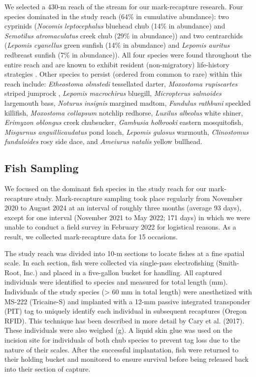 \documentclass[11pt, class=article, crop=false]{standalone}
\begin{document}
We selected a 430-m reach of the stream for our mark-recapture research. Four species dominated in the study reach (64\% in cumulative abundance): two cyprinids (\textit{Nocomis leptocephalus} bluehead chub  (14\% in abundance) and \textit{Semotilus atromaculatus} creek chub (29\% in abundance)) and two centrarchids (\textit{Lepomis cyanellus} green sunfish (14\% in abundance) and \textit{Lepomis auritus} redbreast sunfish (7\% in abundance)). All four species were found throughout the entire reach and are known to exhibit resident (non-migratory) life-history strategies \citep{teruiNonrandomDispersalSympatric2021}. Other species to persist (ordered from common to rare) within this reach include: \textit{Etheostoma olmstedi} tessellated darter, \textit{Moxostoma rupiscartes} striped jumprock , \textit{Lepomis macrochirus} bluegill, \textit{Micropterus salmoides} largemouth bass, \textit{Noturus insignis} margined madtom, \textit{Fundulus rathbuni} speckled killifish, \textit{Moxostoma collapsum} notchlip redhorse, \textit{Luxilus albeolus} white shiner, \textit{Erimyzon oblongus} creek chubsucker, \textit{Gambusia holbrooki} eastern mosquitofish, \textit{Misgurnus anguillicaudatus} pond loach, \textit{Lepomis gulosus} warmouth, \textit{Clinostomus funduloides} rosy side dace, and \textit{Ameiurus natalis} yellow bullhead. 

\subsection{Fish Sampling}

We focused on the dominant fish species in the study reach for our mark-recapture study. Mark-recapture sampling took place regularly from November 2020 to August 2024 at an interval of roughly three months (average 93 days), except for one interval (November 2021 to May 2022; 171 days) in which we were unable to conduct a field survey in February 2022 for logistical reasons. As a result, we collected mark-recapture data for 15 occasions.

The study reach was divided into 10-m sections to locate fishes at a fine spatial scale. In each section, fish were collected via single-pass electrofishing (Smith-Root, Inc.) and placed in a five-gallon bucket for handling. All captured individuals were identified to species and measured for total length (mm). Individuals of the study species (> 60 mm in total length) were anesthetized with MS-222 (Tricaine-S) and implanted with a 12-mm passive integrated transponder (PIT) tag to uniquely identify each individual in subsequent recaptures (Oregon RFID). This technique has been described in more detail by Cary et al. (2017). These individuals were also weighed (g). A liquid skin glue was used on the incision site for individuals of both chub species to prevent tag loss due to the nature of their scales. After the successful implantation, fish were returned to their holding bucket and monitored to ensure survival before being released back into their section of capture. 
\end{document}
